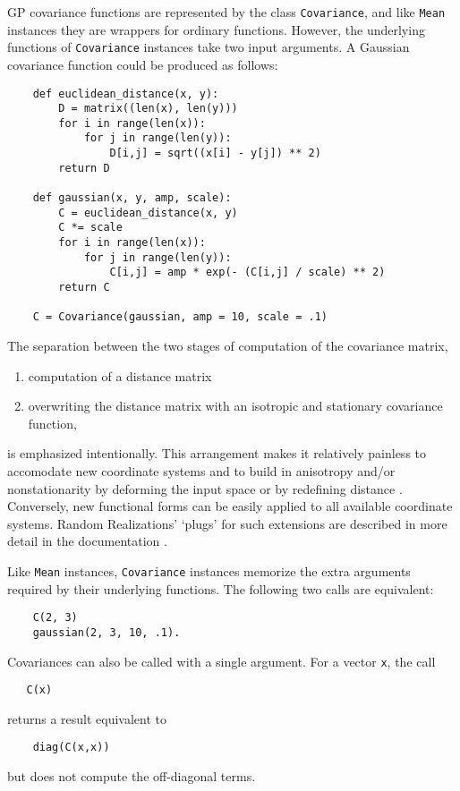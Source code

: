 \documentclass{report}
\begin{document}
GP covariance functions are represented by the class \texttt{Covariance}, and like \texttt{Mean} instances they are wrappers for ordinary functions. However, the underlying functions of \texttt{Covariance} instances take two input arguments. A Gaussian covariance function could be produced as follows:
\begin{verbatim}
    def euclidean_distance(x, y):
        D = matrix((len(x), len(y)))
        for i in range(len(x)):
            for j in range(len(y)):
                D[i,j] = sqrt((x[i] - y[j]) ** 2)
        return D
    
    def gaussian(x, y, amp, scale):
        C = euclidean_distance(x, y)
        C *= scale
        for i in range(len(x)):
            for j in range(len(y)):
                C[i,j] = amp * exp(- (C[i,j] / scale) ** 2)
        return C
        
    C = Covariance(gaussian, amp = 10, scale = .1)
\end{verbatim}
The separation between the two stages of computation of the covariance matrix,
\begin{enumerate}
    \item computation of a distance matrix
    \item overwriting the distance matrix with an isotropic and stationary covariance function,
\end{enumerate}
is emphasized intentionally. This arrangement makes it relatively painless to accomodate new coordinate systems and to build in anisotropy and/or nonstationarity by deforming the input space \cite{sampson} or by redefining distance \cite{pachische}. Conversely, new functional forms can be easily applied to all available coordinate systems. Random Realizations' `plugs' for such extensions are described in more detail in the documentation \cite{me_SR}.


Like \texttt{Mean} instances, \texttt{Covariance} instances memorize the extra arguments required by their underlying functions. The following two calls are equivalent:
\begin{verbatim}
    C(2, 3)
    gaussian(2, 3, 10, .1).
\end{verbatim}
Covariances can also be called with a single argument. For a vector \texttt{x}, the call
\begin{verbatim}
   C(x)
\end{verbatim}
returns a result equivalent to
\begin{verbatim}
    diag(C(x,x))
\end{verbatim}
but does not compute the off-diagonal terms.
\end{document}
